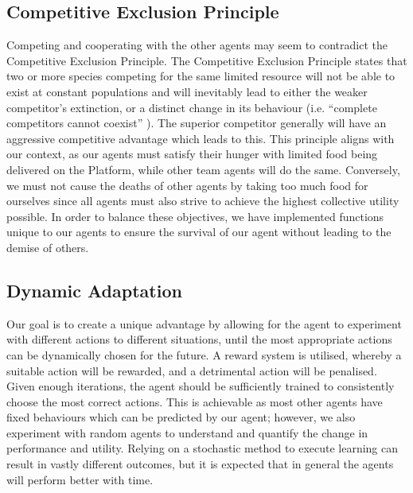 \subsection{Competitive Exclusion Principle}
Competing and cooperating with the other agents may seem to contradict the Competitive Exclusion Principle. The Competitive Exclusion Principle states that two or more species competing for the same limited resource will not be able to exist at constant populations and will inevitably lead to either the weaker competitor’s extinction, or a distinct change in its behaviour (i.e. “complete competitors cannot coexist” \cite{HardinGarrett1960TCEP}). The superior competitor generally will have an aggressive competitive advantage which leads to this. This principle aligns with our context, as our agents must satisfy their hunger with limited food being delivered on the Platform, while other team agents will do the same. Conversely, we must not cause the deaths of other agents by taking too much food for ourselves since all agents must also strive to achieve the highest collective utility possible. In order to balance these objectives, we have implemented functions unique to our agents to ensure the survival of our agent without leading to the demise of others.  

\subsection{Dynamic Adaptation}
Our goal is to create a unique advantage by allowing for the agent to experiment with different actions to different situations, until the most appropriate actions can be dynamically chosen for the future. A reward system is utilised, whereby a suitable action will be rewarded, and a detrimental action will be penalised. Given enough iterations, the agent should be sufficiently trained to consistently choose the most correct actions. This is achievable as most other agents have fixed behaviours which can be predicted by our agent; however, we also experiment with random agents to understand and quantify the change in performance and utility. Relying on a stochastic method to execute learning can result in vastly different outcomes, but it is expected that in general the agents will perform better with time.
